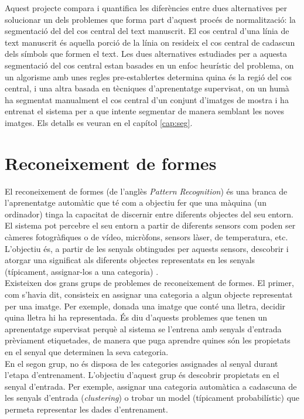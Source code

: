 Aquest projecte compara i quantifica les diferències entre dues alternatives per solucionar un dels problemes que forma part d'aquest procés de normalització: la segmentació del del cos central del text manuscrit. El cos central d'una línia de text manuscrit és aquella porció de la línia on resideix el cos central de cadascun dels símbols que formen el text. Les dues alternatives estudiades per a aquesta segmentació del cos central estan basades en un enfoc heurístic del problema, on un algorisme amb unes regles pre-establertes determina quina és la regió del cos central, i una altra basada en tècniques d'aprenentatge supervisat, on un humà ha segmentat manualment el cos central d'un conjunt d'imatges de mostra i ha entrenat el sistema per a que intente segmentar de manera semblant les noves imatges. Els detalls es veuran en el capítol \ref{cap:seg}.


\section{Reconeixement de formes}
El reconeixement de formes (de l'anglès \emph{Pattern Recognition}) és una branca de l'aprenentatge automàtic que té com a objectiu fer que una màquina (un ordinador) tinga la capacitat de discernir entre diferents objectes del seu entorn. El sistema pot percebre el seu entorn a partir de diferents sensors com poden ser càmeres fotogràfiques o de vídeo, micròfons, sensors làser, de temperatura, etc. L'objectiu és, a partir de les senyals obtingudes per aquests sensors, descobrir i atorgar una significat als diferents objectes representats en les senyals (típicament, assignar-los a una categoria) \cite{DH73}.\\

Existeixen dos grans grups de problemes de reconeixement de formes. El primer, com s'havia dit, consisteix en assignar una categoria a algun objecte representat per una imatge. Per exemple, donada una imatge que conté una lletra, decidir quina lletra hi ha representada. És diu d'aquests problemes que tenen un aprenentatge supervisat perquè al sistema se l'entrena amb senyals d'entrada prèviament etiquetades, de manera que puga aprendre quines són les propietats en el senyal que determinen la seva categoria.\\

En el segon grup, no és disposa de les categories assignades al senyal durant l'etapa d'entrenament. L'objectiu d'aquest grup és descobrir propietats en el senyal d'entrada. Per exemple, assignar una categoria automàtica a cadascuna de les senyals d'entrada (\emph{clustering}) o trobar un model (típicament probabilístic) que permeta representar les dades d'entrenament. \\

